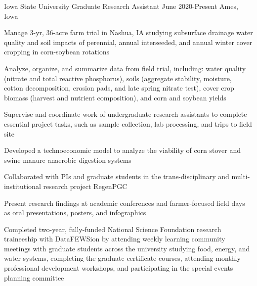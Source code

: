 

\begin{cventries}

  \cventry
    {Iowa State University} %
    {Graduate Research Assistant} %
    {June 2020-Present} %
    {Ames, Iowa} %
    {
      \begin{cvitems} %
      \setlength\itemsep{.4em}
        \item {Manage 3-yr, 36-acre farm trial in Nashua, IA studying subsurface drainage water quality and soil impacts of perennial, annual interseeded, and annual winter cover cropping in corn-soybean rotations }
        \item {Analyze, organize, and summarize data from field trial, including: water quality (nitrate and total reactive phosphorus), soils (aggregate stability, moisture, cotton decomposition, erosion pads, and late spring nitrate test), cover crop biomass (harvest and nutrient composition), and corn and soybean yields }
        \item {Supervise and coordinate work of undergraduate research assistants to complete essential project tasks, such as sample collection, lab processing, and trips to field site}
        \item {Developed a technoeconomic model to analyze the viability of corn stover and swine manure anaerobic digestion systems}
        \item {Collaborated with PIs and graduate students in the trans-disciplinary and multi-institutional research project RegenPGC}
         \item {Present research findings at academic conferences and farmer-focused field days as oral presentations, posters, and infographics}
        \item {Completed two-year, fully-funded National Science Foundation research traineeship with DataFEWSion by attending weekly learning community meetings with graduate students across the university studying food, energy, and water systems, completing the graduate certificate courses, attending monthly professional development workshops, and participating in the special events planning committee}

\end{cvitems}}
\end{cventries}
